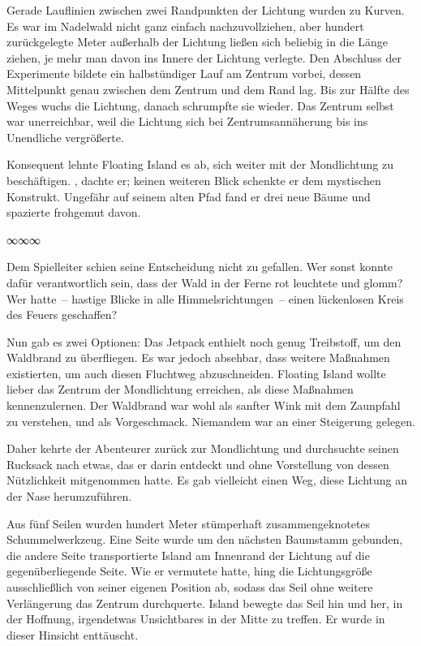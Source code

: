 Gerade Lauflinien zwischen zwei Randpunkten der Lichtung wurden zu Kurven. Es war im Nadelwald nicht ganz einfach nachzuvollziehen, aber hundert zurückgelegte Meter außerhalb der Lichtung ließen sich beliebig in die Länge ziehen, je mehr man davon ins Innere der Lichtung verlegte. Den Abschluss der Experimente bildete ein halbstündiger Lauf am Zentrum vorbei, dessen Mittelpunkt genau zwischen dem Zentrum und dem Rand lag. Bis zur Hälfte des Weges wuchs die Lichtung, danach schrumpfte sie wieder. Das Zentrum selbst war unerreichbar, weil die Lichtung sich bei Zentrumsannäherung bis ins Unendliche vergrößerte.

Konsequent lehnte Floating Island es ab, sich weiter mit der Mondlichtung zu beschäftigen. , dachte er; keinen weiteren Blick schenkte er dem mystischen Konstrukt. Ungefähr auf seinem alten Pfad fand er drei neue Bäume und spazierte frohgemut davon.

\begin{center}
∞∞∞
\end{center}

Dem Spielleiter schien seine Entscheidung nicht zu gefallen. Wer sonst konnte dafür verantwortlich sein, dass der Wald in der Ferne rot leuchtete und glomm? Wer hatte~– hastige Blicke in alle Himmelsrichtungen~– einen lückenlosen Kreis des Feuers geschaffen?

Nun gab es zwei Optionen: Das Jetpack enthielt noch genug Treibstoff, um den Waldbrand zu überfliegen. Es war jedoch absehbar, dass weitere Maßnahmen existierten, um auch diesen Fluchtweg abzuschneiden. Floating Island wollte lieber das Zentrum der Mondlichtung erreichen, als diese Maßnahmen kennenzulernen. Der Waldbrand war wohl als sanfter Wink mit dem Zaunpfahl zu verstehen, und als Vorgeschmack. Niemandem war an einer Steigerung gelegen.

Daher kehrte der Abenteurer zurück zur Mondlichtung und durchsuchte seinen Rucksack nach etwas, das er darin entdeckt und ohne Vorstellung von dessen Nützlichkeit mitgenommen hatte. Es gab vielleicht einen Weg, diese Lichtung an der Nase herumzuführen.

Aus fünf Seilen wurden hundert Meter stümperhaft zusammengeknotetes Schummelwerkzeug. Eine Seite wurde um den nächsten Baumstamm gebunden, die andere Seite transportierte Island am Innenrand der Lichtung auf die gegenüberliegende Seite. Wie er vermutete hatte, hing die Lichtungsgröße ausschließlich von seiner eigenen Position ab, sodass das Seil ohne weitere Verlängerung das Zentrum durchquerte. Island bewegte das Seil hin und her, in der Hoffnung, irgendetwas Unsichtbares in der Mitte zu treffen. Er wurde in dieser Hinsicht enttäuscht.

